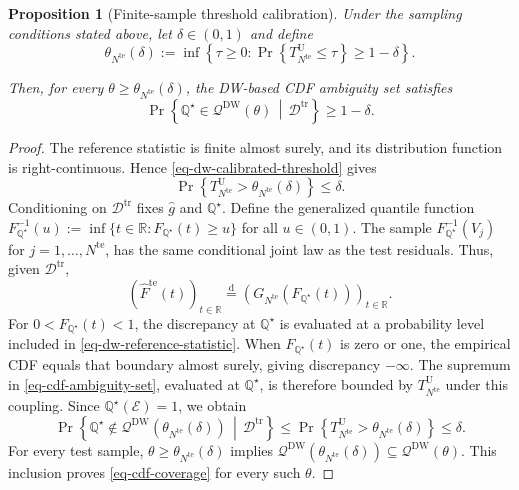 \documentclass[review,11pt,3p,authoryear,nopreprintline]{elsarticle}
\newtheorem{proposition}{Proposition}
\begin{document}
\begin{proposition}[Finite-sample threshold calibration]
  \label{proposition-01}
  Under the sampling conditions stated above, let $\delta\in(0,1)$ and define
  \begin{equation}
    \theta_{N^{\mathrm{te}}}(\delta):=\inf\left\{\tau\ge0:\Pr\left\{T_{N^{\mathrm{te}}}^{\mathrm U}\le\tau\right\}\ge1-\delta\right\}.
    \label{eq-dw-calibrated-threshold}
  \end{equation}

  Then, for every $\theta\ge\theta_{N^{\mathrm{te}}}(\delta)$, the DW-based CDF ambiguity set satisfies
  \begin{equation}
    \Pr\left\{\mathbb Q^\star\in\mathcal Q^{\mathrm{DW}}(\theta)\,\middle|\,\mathcal D^{\mathrm{tr}}\right\}\ge1-\delta.
    \label{eq-cdf-coverage}
  \end{equation}
\end{proposition}
\begin{proof}
  The reference statistic is finite almost surely, and its distribution function is right-continuous. Hence \eqref{eq-dw-calibrated-threshold} gives
  \[
    \Pr\left\{T_{N^{\mathrm{te}}}^{\mathrm U}>\theta_{N^{\mathrm{te}}}(\delta)\right\}\le\delta.
  \]
  Conditioning on $\mathcal D^{\mathrm{tr}}$ fixes $\hat g$ and $\mathbb Q^\star$. Define the generalized quantile function $F_{\mathbb Q^\star}^{-1}(u):=\inf\{t\in\mathbb R:F_{\mathbb Q^\star}(t)\ge u\}$ for all $u\in(0,1)$. The sample $F_{\mathbb Q^\star}^{-1}(V_j)$ for $j=1,\ldots,N^{\mathrm{te}}$, has the same conditional joint law as the test residuals. Thus, given $\mathcal D^{\mathrm{tr}}$,
  \[
    \left(\widehat F^{\mathrm{te}}(t)\right)_{t\in\mathbb R}\overset{\mathrm d}{=}\left(G_{N^{\mathrm{te}}}\!\left(F_{\mathbb Q^\star}(t)\right)\right)_{t\in\mathbb R}.
  \]
  For $0<F_{\mathbb Q^\star}(t)<1$, the discrepancy at $\mathbb Q^\star$ is evaluated at a probability level included in \eqref{eq-dw-reference-statistic}. When $F_{\mathbb Q^\star}(t)$ is zero or one, the empirical CDF equals that boundary almost surely, giving discrepancy $-\infty$. The supremum in \eqref{eq-cdf-ambiguity-set}, evaluated at $\mathbb Q^\star$, is therefore bounded by $T_{N^{\mathrm{te}}}^{\mathrm U}$ under this coupling. Since $\mathbb Q^\star(\mathcal E)=1$, we obtain
  \[
    \Pr\left\{\mathbb Q^\star\notin\mathcal Q^{\mathrm{DW}}\!\left(\theta_{N^{\mathrm{te}}}(\delta)\right)\,\middle|\,\mathcal D^{\mathrm{tr}}\right\}
    \le\Pr\left\{T_{N^{\mathrm{te}}}^{\mathrm U}>\theta_{N^{\mathrm{te}}}(\delta)\right\}\le\delta.
  \]
  For every test sample, $\theta\ge\theta_{N^{\mathrm{te}}}(\delta)$ implies $\mathcal Q^{\mathrm{DW}}\!\left(\theta_{N^{\mathrm{te}}}(\delta)\right)\subseteq\mathcal Q^{\mathrm{DW}}(\theta)$. This inclusion proves \eqref{eq-cdf-coverage} for every such $\theta$.
\end{proof}
\end{document}
